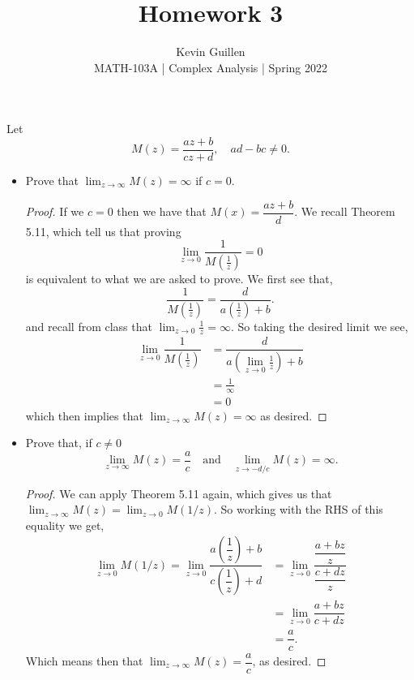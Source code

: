 \documentclass[11pt]{article}
\newenvironment{problem}[2][Problem\!]{\begin{trivlist}
\item[\hskip \labelsep {\bfseries #1}\hskip \labelsep {\bfseries #2}]}{\end{trivlist}}
\newcommand{\lrp}[1]{\left(#1\right)}
\begin{document}
 
\title{Homework 3}
\author{Kevin Guillen\\[0.5em]
MATH-103A  | Complex Analysis | Spring 2022}
\date{} 
\maketitle

\begin{problem}{3.1}
Let \[M(z) = \dfrac{az + b}{cz + d},\quad ad-bc \neq 0.\]
\begin{itemize}[itemsep=3em]
\item[(a)] Prove that $\displaystyle\lim_{z \to \infty} M(z) = \infty$ if $c = 0$.
\begin{proof}
  If we $c =0$ then we have that $M(x) = \dfrac{az + b}{d}$. We recall Theorem 5.11, which tell us that proving
  \[\lim_{z\to 0}\dfrac{1}{M(\frac{1}{z})} = 0\]
  is equivalent to what we are asked to prove. We first see that,
  \[\dfrac{1}{M(\frac{1}{z})} = \dfrac{d}{a(\frac{1}{z}) +b }.\]
  and recall from class that $\displaystyle\lim_{z\to 0}\frac{1}{z} = \infty$.
  So taking the desired limit we see,
  \begin{align*}
    \lim_{z\to 0}\dfrac{1}{M(\frac{1}{z})} &= \dfrac{ d }{ a\lrp{\lim_{z\to 0}\frac{1}{z} } + b } \\
    &= \frac{1}{\infty} \\
    &= 0
  \end{align*}
  which then implies that $\displaystyle\lim_{z \to \infty} M(z) = \infty$ as desired.

\end{proof}
\newpage
\item[(b)] Prove that, if $c\neq 0$ \[\displaystyle\lim_{z \to \infty} M(z) = \dfrac{a}{c} \quad \text{and} \quad \displaystyle\lim_{z \to -d/c}M(z) = \infty.\]
\begin{proof}
  We can apply Theorem 5.11 again, which gives us that $\displaystyle\lim_{z \to \infty} M(z) = \lim_{z \to 0}M(1/z)$.
  So working with the RHS of this equality we get,
  \begin{align*}
    \lim_{z\to 0 }M(1/z) = \lim_{z\to 0 }\dfrac{ a\lrp{\dfrac{1}{z}} + b  }{ c\lrp{\dfrac{1}{z}} + d } &= \lim_{z\to 0 }\dfrac{\dfrac{a + bz}{z}}{\dfrac{c + dz}{z}} \\
    &= \lim_{z\to 0 }\dfrac{a + bz}{c+ dz} \\
    &= \dfrac{a}{c}.
  \end{align*}
  Which means then that $\displaystyle\lim_{z \to \infty} M(z) = \dfrac{a}{c}$, as desired. 
\end{proof}


\end{itemize}
\end{problem}
\end{document}
